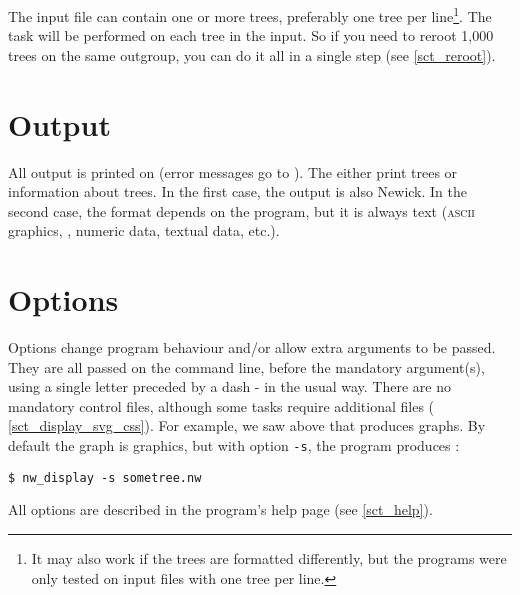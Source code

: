 The input file can contain one or more trees, preferably one tree per
line\footnote{It may also work if the trees are formatted differently, but the
programs were only tested on input files with one tree per line.}. The task
will be performed on each tree in the input. So if you need to reroot 1,000
trees on the same outgroup, you can do it all in a single step (see
\ref{sct_reroot}). 

\section{Output}
\label{sct_output}

All output is printed on \stdout{} (error messages go to \stderr). The \nutils{}
either print trees or information about trees. In the first case, the output is
also Newick. In the second case, the format depends on the program, but it is
always text (\textsc{ascii} graphics, \svg, numeric data, textual data, etc.).

\section{Options}
\label{sct_options}

Options change program behaviour and/or allow extra arguments to be passed.
They are all passed on the command line, before the mandatory argument(s),
using a single letter preceded by a dash - in the usual \unix{} way. There are
no mandatory control files, although some tasks require additional files (\eg{}
\ref{sct_display_svg_css}). For example, we saw above that \display{} produces
graphs. By default the graph is \ascii{} graphics, but with option \texttt{-s},
the program produces \svg:
\begin{verbatim}
$ nw_display -s sometree.nw
\end{verbatim}
All options are described in the program's help page (see \ref{sct_help}).
